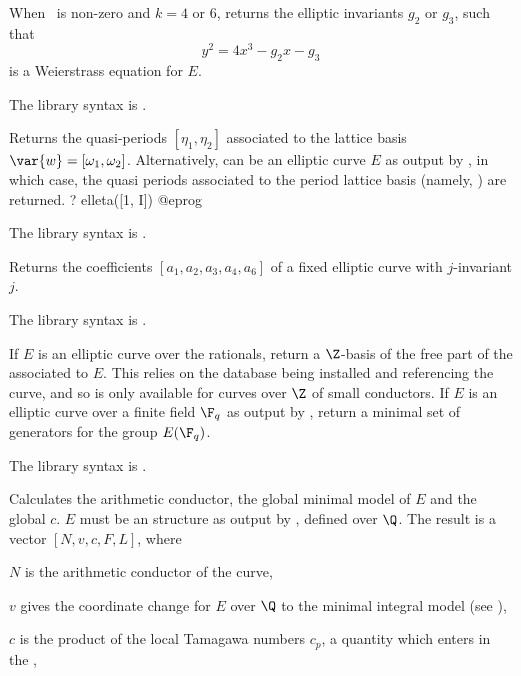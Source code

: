 When \fl\ is non-zero and $k=4$ or 6, returns the elliptic invariants $g_2$
or $g_3$, such that
$$y^2 = 4x^3 - g_2 x - g_3$$
is a Weierstrass equation for $E$.

The library syntax is .

\label{se:elleta}
Returns the quasi-periods $[\eta_1,\eta_2]$
associated to the lattice basis $\var{w} = [\omega_1, \omega_2]$.
Alternatively,  can be an elliptic curve $E$ as output by
, in which case, the quasi periods associated to the period
lattice basis  (namely, ) are returned.
\bprog
? elleta([1, I])
@eprog

The library syntax is .

\label{se:ellfromj}
Returns the coefficients $[a_1,a_2,a_3,a_4,a_6]$ of a fixed elliptic curve
with $j$-invariant $j$.

The library syntax is .

\label{se:ellgenerators}
If $E$ is an elliptic curve over the rationals, return a $\Z$-basis of the
free part of the  associated to $E$.  This relies on
the  database being installed and referencing the curve, and so
is only available for curves over $\Z$ of small conductors.
If $E$ is an elliptic curve over a finite field $\F_q$ as output by
, return a minimal set of generators for the group $E(\F_q)$.

The library syntax is .

\label{se:ellglobalred}
Calculates the arithmetic conductor, the global
minimal model of $E$ and the global  $c$.
$E$ must be an  structure as output by , defined over
$\Q$. The result is a vector $[N,v,c,F,L]$, where

\item $N$ is the arithmetic conductor of the curve,

\item $v$ gives the coordinate change for $E$ over $\Q$ to the minimal
integral model (see ),

\item $c$ is the product of the local Tamagawa numbers $c_p$, a quantity
which enters in the ,

